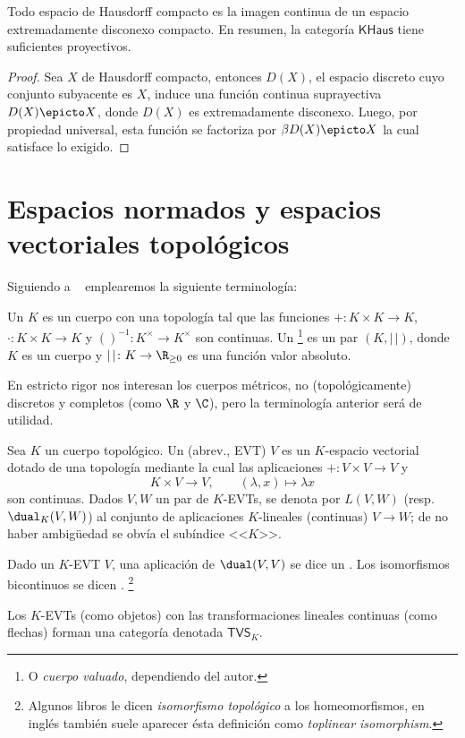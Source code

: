 \documentclass[topologia-analisis.tex]{subfiles}
\begin{document}
\begin{cor}
	Todo espacio de Hausdorff compacto es la imagen continua de un espacio extremadamente disconexo compacto.
	En resumen, la categoría $\mathsf{KHaus}$ tiene suficientes proyectivos.
\end{cor}
\begin{proof}
	Sea $X$ de Hausdorff compacto, entonces $D(X)$, el espacio discreto cuyo conjunto subyacente es $X$, induce una función continua suprayectiva
	$D(X) \epicto X$, donde $D(X)$ es extremadamente disconexo.
	Luego, por propiedad universal, esta función se factoriza por $\beta D(X) \epicto X$ la cual satisface lo exigido.
\end{proof}

\section{Espacios normados y espacios vectoriales topológicos}
Siguiendo a \citeauthor{bourbaki:evt}~\cite{bourbaki:evt} emplearemos la siguiente terminología:
\begin{mydef}
	Un  $K$ es un cuerpo con una topología
	tal que las funciones ${+} \colon K\times K \to K$, ${\cdot} \colon K\times K \to K$ y $()^{-1} \colon K^\times \to K^\times$
	son continuas.
	Un %
	\footnote{O \emph{cuerpo valuado}, dependiendo del autor.}
	es un par $(K, |\,|)$, donde $K$ es un cuerpo y $|\,| \colon K \to \R_{\ge 0}$ es una función valor absoluto.
\end{mydef}

En estricto rigor nos interesan los cuerpos métricos, no (topológicamente) discretos y completos (como $\R$ y $\C$),
pero la terminología anterior será de utilidad.
\begin{mydefi}
	Sea $K$ un cuerpo topológico.
	Un  (abrev., EVT) $V$ es un $K$-espacio vectorial
	dotado de una topología mediante la cual las aplicaciones ${+} \colon V\times V \to V$ y
	\[
		K\times V \longrightarrow V, \qquad (\lambda, x) \longmapsto \lambda x
	\]
	son continuas.
	Dados $V, W$ un par de $K$-EVTs, se denota por $L(V, W)$ (resp.\ $\dual_K(V, W)$) al conjunto de aplicaciones $K$-lineales (continuas) $V \to W$;
	de no haber ambigüedad se obvía el subíndice <<$K$>>.

	Dado un $K$-EVT $V$, una aplicación de $\dual(V, V)$ se dice un .
	Los isomorfismos bicontinuos se dicen .%
	\footnote{Algunos libros le dicen \textit{isomorfismo topológico} a los homeomorfismos, en inglés también suele aparecer ésta definición
	como \textit{toplinear isomorphism}.}
\end{mydefi}
\begin{cor}
	Los $K$-EVTs (como objetos) con las transformaciones lineales continuas (como flechas) forman una categoría denotada $\mathsf{TVS}_K$.
\end{cor}
\end{document}
